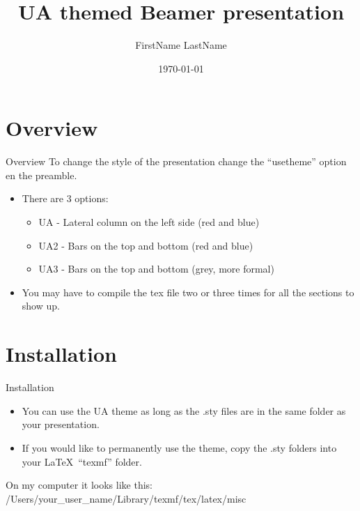 \documentclass{beamer}
\title{UA themed Beamer presentation}
\author[LastName]{FirstName LastName}
\institute{University of Arizona}
\date{\today}
\begin{document}
\begin{frame}%
  \titlepage
\end{frame}

\begin{frame}
	\tableofcontents
\end{frame}

\section{Overview} %
\label{sec:overview}

\begin{frame}{Overview}
	To change the style of the presentation change the ``usetheme'' option en the preamble. \pause
	\begin{itemize}
		\item There are 3 options: \pause
		\begin{itemize}
			\item UA - Lateral column on the left side (red and blue) 
			\item UA2 - Bars on the top and bottom (red and blue) 
			\item UA3 - Bars on the top and bottom (grey, more formal) 
		\end{itemize} \pause
		\item You may have to compile the tex file two or three times for all the sections to show up.
	\end{itemize}
\end{frame}


\section{Installation} %
\label{sec:installation}

\begin{frame}{Installation}
	\begin{itemize}
		\item You can use the UA theme as long as the .sty files are in the same folder as your presentation.
		\item If you would like to permanently use the theme, copy the .sty folders into your \LaTeX\ ``texmf'' folder.
	\end{itemize}
	On my computer it looks like this: \\
	\vspace{2.5mm}
	/Users/{your\_user\_name}/Library/texmf/tex/latex/misc
\end{frame}
\end{document}
